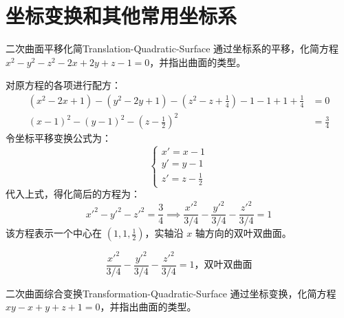 \section{坐标变换和其他常用坐标系}

\begin{problem}{二次曲面平移化简}{Translation-Quadratic-Surface}
    通过坐标系的平移，化简方程 $x^2 - y^2 - z^2 - 2x + 2y + z - 1 = 0$，并指出曲面的类型。
\end{problem}

\begin{solution}
    对原方程的各项进行配方：
    \begin{equation}
        \begin{aligned}
            (x^2 - 2x + 1) - (y^2 - 2y + 1) - \left( z^2 - z + \frac{1}{4} \right) - 1 - 1 + 1 + \frac{1}{4} & = 0           \\
            (x - 1)^2 - (y - 1)^2 - \left( z - \frac{1}{2} \right)^2                                         & = \frac{3}{4}
        \end{aligned}
    \end{equation}
    令坐标平移变换公式为：
    \begin{equation}
        \begin{cases}
            x' = x - 1 \\
            y' = y - 1 \\
            z' = z - \frac{1}{2}
        \end{cases}
    \end{equation}
    代入上式，得化简后的方程为：
    \begin{equation}
        x'^2 - y'^2 - z'^2 = \frac{3}{4} \implies \frac{x'^2}{3/4} - \frac{y'^2}{3/4} - \frac{z'^2}{3/4} = 1
    \end{equation}
    该方程表示一个中心在 $\left( 1, 1, \frac{1}{2} \right)$，实轴沿 $x$ 轴方向的双叶双曲面。

    \begin{equation}
        \boxed{\frac{x'^2}{3/4} - \frac{y'^2}{3/4} - \frac{z'^2}{3/4} = 1，\text{双叶双曲面}}
    \end{equation}
\end{solution}

\begin{problem}{二次曲面综合变换}{Transformation-Quadratic-Surface}
    通过坐标变换，化简方程 $xy - x + y + z + 1 = 0$，并指出曲面的类型。
\end{problem}


